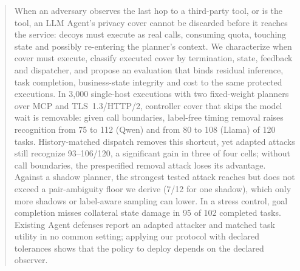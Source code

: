 \begin{abstract}
When an adversary observes the last hop to a third-party tool, or is the tool, an LLM Agent's privacy cover cannot be discarded before it reaches the service: decoys must execute as real calls, consuming quota, touching state and possibly re-entering the planner's context. We characterize when cover must execute, classify executed cover by termination, state, feedback and dispatcher, and propose an evaluation that binds residual inference, task completion, business-state integrity and cost to the same protected executions. In 3,000 single-host executions with two fixed-weight planners over MCP and TLS~1.3/HTTP/2, controller cover that skips the model wait is removable: given call boundaries, label-free timing removal raises recognition from 75 to 112 (Qwen) and from 80 to 108 (Llama) of 120 tasks. History-matched dispatch removes this shortcut, yet adapted attacks still recognize 93--106/120, a significant gain in three of four cells; without call boundaries, the prespecified removal attack loses its advantage. Against a shadow planner, the strongest tested attack reaches but does not exceed a pair-ambiguity floor we derive (7/12 for one shadow), which only more shadows or label-aware sampling can lower. In a stress control, goal completion misses collateral state damage in 95 of 102 completed tasks. Existing Agent defenses report an adapted attacker and matched task utility in no common setting; applying our protocol with declared tolerances shows that the policy to deploy depends on the declared observer.
\end{abstract}
